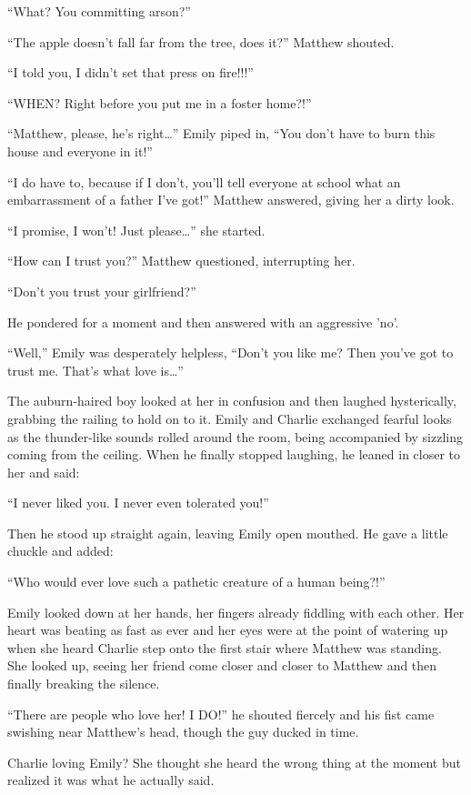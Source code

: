 “What? You committing arson?”

“The apple doesn't fall far from the tree, does it?” Matthew shouted.

“I told you, I didn't set that press on fire!!!”

“WHEN? Right before you put me in a foster home?!”

“Matthew, please, he's right…” Emily piped in, “You don't have to burn this house and everyone in it!”

“I do have to, because if I don't, you'll tell everyone at school what an embarrassment of a father I've got!” Matthew answered, giving her a dirty look.

“I promise, I won't! Just please…” she started.

“How can I trust you?” Matthew questioned, interrupting her.

“Don't you trust your girlfriend?”

He pondered for a moment and then answered with an aggressive 'no'.

“Well,” Emily was desperately helpless, “Don't you like me? Then you've got to trust me. That's what love is…”

The auburn-haired boy looked at her in confusion and then laughed hysterically, grabbing the railing to hold on to it. Emily and Charlie exchanged fearful looks as the thunder-like sounds rolled around the room, being accompanied by sizzling coming from the ceiling. When he finally stopped laughing, he leaned in closer to her and said:

“I never liked you. I never even tolerated you!”

Then he stood up straight again, leaving Emily open mouthed. He gave a little chuckle and added:

“Who would ever love such a pathetic creature of a human being?!”

Emily looked down at her hands, her fingers already fiddling with each other. Her heart was beating as fast as ever and her eyes were at the point of watering up when she heard Charlie step onto the first stair where Matthew was standing. She looked up, seeing her friend come closer and closer to Matthew and then finally breaking the silence.

“There are people who love her! I DO!” he shouted fiercely and his fist came swishing near Matthew's head, though the guy ducked in time.

Charlie loving Emily? She thought she heard the wrong thing at the moment but realized it was what he actually said.

